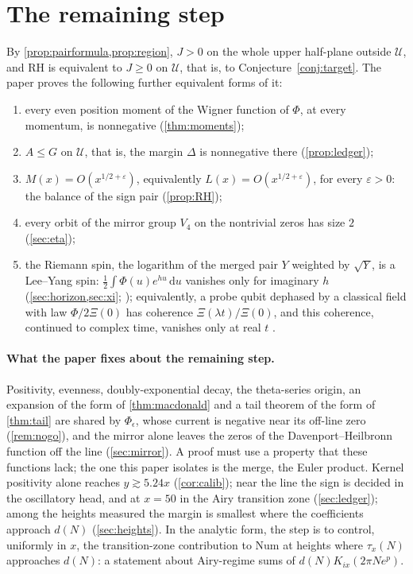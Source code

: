 \documentclass[11pt]{article}
\theoremstyle{definition}\newtheorem{definition}[theorem]{Definition}
\theoremstyle{remark}\newtheorem{remark}[theorem]{Remark}
\newcommand{\dd}{\,\mathrm d}\newcommand{\e}{\mathrm e}
\newcommand{\Num}{\mathrm{Num}}\newcommand{\Den}{\mathrm{Den}}
\begin{document}
\section{The remaining step}\label{sec:target}
By \cref{prop:pairformula,prop:region}, $J>0$ on the whole upper half-plane outside $\mathcal U$, and RH is equivalent to $J\ge0$ on $\mathcal U$, that is, to Conjecture~\ref{conj:target}. The paper proves the following further equivalent forms of it:
\begin{enumerate}[label=(\alph*)]
\item every even position moment of the Wigner function of $\Phi$, at every momentum, is nonnegative (\cref{thm:moments});
\item $A\le G$ on $\mathcal U$, that is, the margin $\Delta$ is nonnegative there (\cref{prop:ledger});
\item $M(x)=O(x^{1/2+\varepsilon})$, equivalently $L(x)=O(x^{1/2+\varepsilon})$, for every $\varepsilon>0$: the balance of the sign pair (\cref{prop:RH});
\item every orbit of the mirror group $V_4$ on the nontrivial zeros has size $2$ (\cref{sec:eta});
\item the Riemann spin, the logarithm of the merged pair $Y$ weighted by $\sqrt Y$, is a Lee--Yang spin: $\frac12\int\Phi(u)e^{hu}\dd u$ vanishes only for imaginary $h$ (\cref{sec:horizon,sec:xi}; \cite{Newman74,Newman76,NewmanWu}); equivalently, a probe qubit dephased by a classical field with law $\Phi/2\Xi(0)$ has coherence $\Xi(\lambda t)/\Xi(0)$, and this coherence, continued to complex time, vanishes only at real $t$ \cite{SQuant}.
\end{enumerate}

\paragraph{What the paper fixes about the remaining step.} Positivity, evenness, doubly-exponential decay, the theta-series origin, an expansion of the form of \cref{thm:macdonald} and a tail theorem of the form of \cref{thm:tail} are shared by $\Phi_\epsilon$, whose current is negative near its off-line zero (\cref{rem:nogo}), and the mirror alone leaves the zeros of the Davenport--Heilbronn function off the line (\cref{sec:mirror}). A proof must use a property that these functions lack; the one this paper isolates is the merge, the Euler product. Kernel positivity alone reaches $y\gtrsim5.24x$ (\cref{cor:calib}); near the line the sign is decided in the oscillatory head, and at $x=50$ in the Airy transition zone (\cref{sec:ledger}); among the heights measured the margin is smallest where the coefficients approach $d(N)$ (\cref{sec:heights}). In the analytic form, the step is to control, uniformly in $x$, the transition-zone contribution to $\Num$ at heights where $\tau_x(N)$ approaches $d(N)$: a statement about Airy-regime sums of $d(N)K_{ix}(2\pi Ne^p)$.
\end{document}

